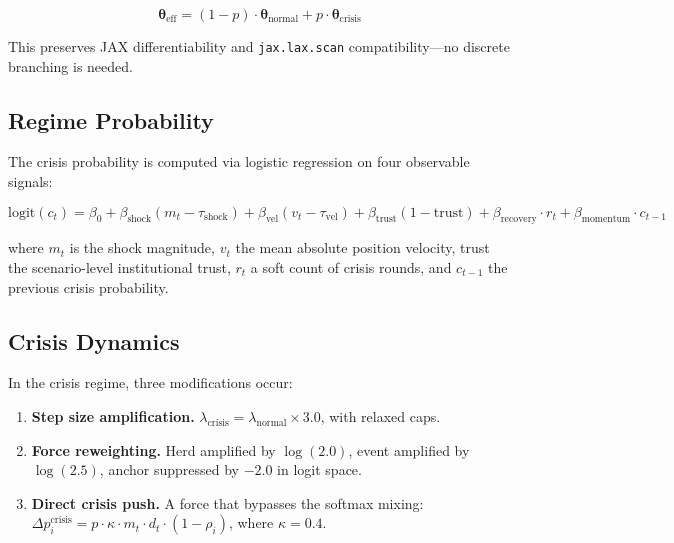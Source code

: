 \documentclass[12pt]{article}
\begin{document}
\begin{equation}\label{eq:regime_interp}
\boldsymbol{\theta}_{\text{eff}} = (1 - p) \cdot \boldsymbol{\theta}_{\text{normal}} + p \cdot \boldsymbol{\theta}_{\text{crisis}}
\end{equation}

This preserves JAX differentiability and \texttt{jax.lax.scan} compatibility---no discrete branching is needed.

\subsection{Regime Probability}

The crisis probability is computed via logistic regression on four observable signals:

\begin{equation}\label{eq:regime_logit}
\text{logit}(c_t) = \beta_0 + \beta_{\text{shock}} (m_t - \tau_{\text{shock}}) + \beta_{\text{vel}} (v_t - \tau_{\text{vel}}) + \beta_{\text{trust}} (1 - \text{trust}) + \beta_{\text{recovery}} \cdot r_t + \beta_{\text{momentum}} \cdot c_{t-1}
\end{equation}

where $m_t$ is the shock magnitude, $v_t$ the mean absolute position velocity, trust the scenario-level institutional trust, $r_t$ a soft count of crisis rounds, and $c_{t-1}$ the previous crisis probability.

\subsection{Crisis Dynamics}

In the crisis regime, three modifications occur:

\begin{enumerate}
    \item \textbf{Step size amplification.} $\lambda_{\text{crisis}} = \lambda_{\text{normal}} \times 3.0$, with relaxed caps.
    \item \textbf{Force reweighting.} Herd amplified by $\log(2.0)$, event amplified by $\log(2.5)$, anchor suppressed by $-2.0$ in logit space.
    \item \textbf{Direct crisis push.} A force that bypasses the softmax mixing: $\Delta p_i^{\text{crisis}} = p \cdot \kappa \cdot m_t \cdot d_t \cdot (1 - \rho_i)$, where $\kappa = 0.4$.
\end{enumerate}
\end{document}
